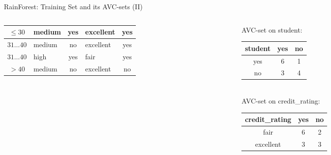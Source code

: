 \begin{frame}{RainForest: Training Set and its AVC-sets (II)}
\begin{columns}
\begin{column}{0.6\textwidth}
\begin{tabular}{|c|l|c|l|c|}
				\cellcolor{yellow!20}$\leq30$     & \cellcolor{yellow!20}medium & \cellcolor{yellow!20}yes   & \cellcolor{yellow!20}excellent    & \cellcolor{green!20}yes            \\\hline
				\cellcolor{yellow!20}$31\ldots40$ & \cellcolor{yellow!20}medium & \cellcolor{yellow!20}no    & \cellcolor{yellow!20}excellent    & \cellcolor{green!20}yes            \\\hline
				\cellcolor{yellow!20}$31\ldots40$ & \cellcolor{yellow!20}high   & \cellcolor{yellow!20}yes   & \cellcolor{yellow!20}fair         & \cellcolor{green!20}yes            \\\hline
				\cellcolor{yellow!20}$>40$        & \cellcolor{yellow!20}medium & \cellcolor{yellow!20}no    & \cellcolor{yellow!20}excellent    & \cellcolor{red!20}no               \\\hline
			\end{tabular}
		\end{column}
		\begin{column}{0.3\textwidth}
			\vspace{-3cm}

			\centering
			AVC-set on student:\\
			\begin{tabular}{|c|c|c|}
				\hline
				student & yes & no \\\hline
				yes     & 6   & 1  \\\hline
				no      & 3   & 4  \\\hline
			\end{tabular}\\[1cm]
			AVC-set on credit\_rating:\\
			\begin{tabular}{|c|c|c|}
				\hline
				credit\_rating & yes & no \\\hline
				fair           & 6   & 2  \\\hline
				excellent      & 3   & 3  \\\hline
			\end{tabular}
		\end{column}
	\end{columns}
\end{frame}

